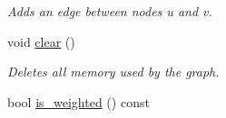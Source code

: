 \begin{DoxyCompactItemize}
\begin{DoxyCompactList}\small\item\em Adds an edge between nodes {\itshape u} and {\itshape v}. \end{DoxyCompactList}\item 
void \hyperlink{classlgraph_1_1uxgraph_aad397c98fd1f144350e4418971319a97}{clear} ()
\begin{DoxyCompactList}\small\item\em Deletes all memory used by the graph. \end{DoxyCompactList}\item 
\hypertarget{classlgraph_1_1uxgraph_a08952515aec4a03dc9fbbfef5e5d35b8}{bool \hyperlink{classlgraph_1_1uxgraph_a08952515aec4a03dc9fbbfef5e5d35b8}{is\-\_\-weighted} () const }\label{classlgraph_1_1uxgraph_a08952515aec4a03dc9fbbfef5e5d35b8}


\end{DoxyCompactItemize}
